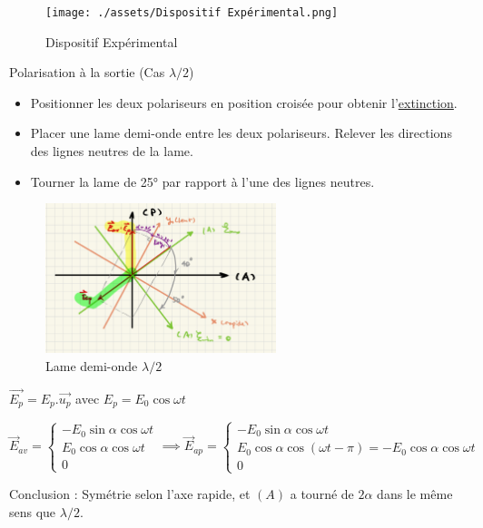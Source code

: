 \begin{figure}[H] %
  \centering
  \texttt{[image: ./assets/Dispositif Expérimental.png]}
  \caption{Dispositif Expérimental}
  \label{fig:Dispositif Expérimental}
\end{figure}

\begin{Example}{Polarisation à la sortie (Cas $\lambda/2$)}{}
  \begin{itemize}

      \item Positionner les deux polariseurs en position croisée pour obtenir l’\underline{extinction}.
      \item Placer une lame demi-onde entre les deux polariseurs. Relever les directions des lignes neutres de la lame. 
\item Tourner la lame de 25° par rapport à l’une des lignes neutres.

  \end{itemize}
\begin{figure}[H] %
  \centering
  \includegraphics[width=0.6\textwidth]{./assets/Lame demi-onde.jpeg}
  \caption{Lame demi-onde $\lambda/2$}
\end{figure}

$\overrightarrow{E_p} = E_p . \overrightarrow{u_p}$ avec $E_p = E_0 \cos \omega t$

\begin{equation}
  \overrightarrow{E} _{av} = \begin{cases}
    - E_0 \sin \alpha \cos \omega t \\ 
    E_0 \cos \alpha \cos \omega t \\ 
    0
  \end{cases} \implies 
  \overrightarrow{E} _{ap} = \begin{cases}
    - E_0 \sin \alpha \cos \omega t \\ 
    E_0 \cos \alpha  \cos (\omega t - \pi)  = - E_0 \cos \alpha \cos \omega t\\ 
    0
  \end{cases}
\end{equation}

Conclusion : Symétrie selon l'axe rapide, et $(A)$ a tourné de $2 \alpha$ dans le même sens que $\lambda/ 2$.
\end{Example}

